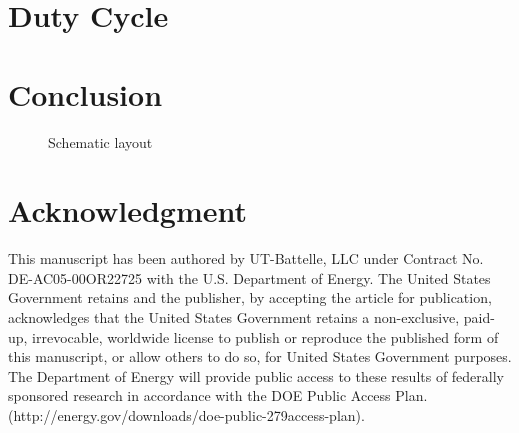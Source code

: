 \documentclass[conference]{IEEEtran}
\begin{document}
\section{Duty Cycle}

\section{Conclusion}


\begin{figure*} %
\centering
{}
\hfill
{}
\caption{Schematic layout}
\label{fig:tbd}
\end{figure*}

\section*{Acknowledgment}
\small{
This manuscript has been authored by UT-Battelle, LLC under Contract No. DE-AC05-00OR22725 with the U.S. Department of Energy. The United States Government retains and the publisher, by accepting the article for publication, acknowledges that the United States Government retains a non-exclusive, paid-up, irrevocable, worldwide license to publish or reproduce the published form of this manuscript, or allow others to do so, for United States Government purposes. The Department of Energy will provide public access to these results of federally sponsored research in accordance with the DOE Public Access Plan. (http://energy.gov/downloads/doe-public-279access-plan).
}
\end{document}
